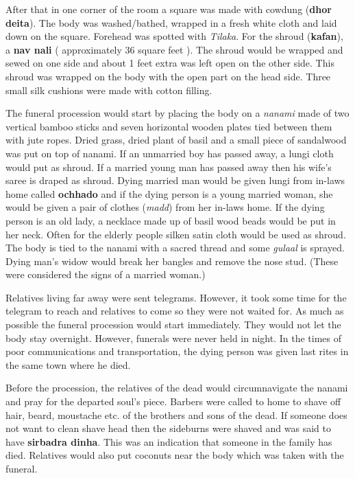 After that in one corner of the room a square was made with cowdung
(\textbf{dhor deita}). The body was washed/bathed, wrapped in a fresh white
cloth and laid down on the square. Forehead was spotted with \textit{Tilaka}.
For the shroud (\textbf{kafan}), a \textbf{nav nali} ( approximately 36 square
feet ). The shroud would be wrapped and sewed on one side and about 1 feet
extra was left open on the other side. This shroud was wrapped on the body with
the open part on the head side. Three small silk cushions were made with cotton
filling.

The funeral procession would start by placing the body on a \textit{nanami} made
of two vertical bamboo sticks and seven horizontal wooden plates tied between
them with jute ropes. Dried grass, dried plant of basil and a small piece of
sandalwood was put on top of nanami. If an unmarried boy has passed away, a
lungi cloth would put as shroud. If a married young man has passed away then
his wife's saree is draped as shroud. Dying married man would be given lungi
from in-laws home called \textbf{ochhado} and if the dying person is a young
married woman, she would be given a pair of clothes (\textit{madd}) from her
in-laws home. If the dying person is an old lady, a necklace made up of basil
wood beads would be put in her neck. Often for the elderly people silken satin
cloth would be used as shroud. The body is tied to the nanami with a sacred
thread and some \textit{gulaal} is sprayed. Dying man's widow would break her
bangles and remove the nose stud. (These were considered the signs of a married
woman.)

Relatives living far away were sent telegrams. However, it took some time for
the telegram to reach and relatives to come so they were not waited for. As
much as possible the funeral procession would start immediately. They would not
let the body stay overnight. However, funerals were never held in night. In the
times of poor communications and transportation, the dying person was given
last rites in the same town where he died.

Before the procession, the relatives of the dead would circumnavigate the
nanami and pray for the departed soul's piece. Barbers were called to home to
shave off hair, beard, moustache etc. of the brothers and sons of the dead. If
someone does not want to clean shave head then the sideburns were shaved and
was said to have \textbf{sirbadra dinha}. This was an indication that someone
in the family has died. Relatives would also put coconuts near the body which
was taken with the funeral.

